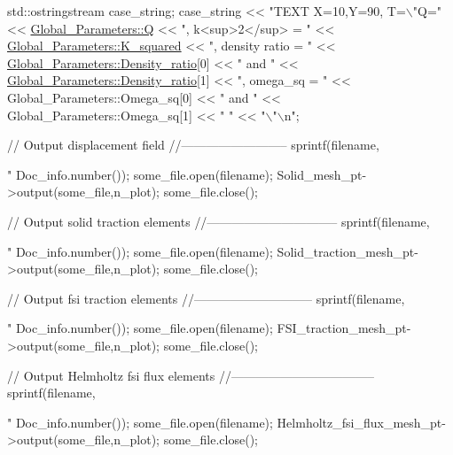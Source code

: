 \begin{DoxyCodeInclude}
{{ std::ostringstream case\_string;
 case\_string << \textcolor{stringliteral}{"TEXT X=10,Y=90, T=\(\backslash\)"Q="} 
             <<  \hyperlink{namespaceGlobal__Parameters_a7814fddf663e56168174a42d2cd6b4c1}{Global\_Parameters::Q} 
             << \textcolor{stringliteral}{",  k<sup>2</sup> = "}
             <<  \hyperlink{namespaceGlobal__Parameters_a91a3fa265abaf9e724c668ee800ffb29}{Global\_Parameters::K\_squared}
             << \textcolor{stringliteral}{",  density ratio = "}
             <<  \hyperlink{namespaceGlobal__Parameters_a517d4c31b8bce6563c2f605266dd9679}{Global\_Parameters::Density\_ratio}[0] << \textcolor{stringliteral}{" and "}
             <<  \hyperlink{namespaceGlobal__Parameters_a517d4c31b8bce6563c2f605266dd9679}{Global\_Parameters::Density\_ratio}[1] 
             << \textcolor{stringliteral}{",  omega\_sq = "}
             <<  Global\_Parameters::Omega\_sq[0] << \textcolor{stringliteral}{" and "} 
             <<  Global\_Parameters::Omega\_sq[1] << \textcolor{stringliteral}{" "} 
             << \textcolor{stringliteral}{"\(\backslash\)"\(\backslash\)n"};


 \textcolor{comment}{// Output displacement field}
 \textcolor{comment}{//--------------------------}
 sprintf(filename,\textcolor{stringliteral}{"%
         Doc\_info.number());
 some\_file.open(filename);
 Solid\_mesh\_pt->output(some\_file,n\_plot);
 some\_file.close();

 \textcolor{comment}{// Output solid traction elements}
 \textcolor{comment}{//--------------------------------}
 sprintf(filename,\textcolor{stringliteral}{"%
         Doc\_info.number());
 some\_file.open(filename);
 Solid\_traction\_mesh\_pt->output(some\_file,n\_plot);
 some\_file.close();

 \textcolor{comment}{// Output fsi traction elements}
 \textcolor{comment}{//----------------------------- }
 sprintf(filename,\textcolor{stringliteral}{"%
         Doc\_info.number());
 some\_file.open(filename);
 FSI\_traction\_mesh\_pt->output(some\_file,n\_plot);
 some\_file.close();


 \textcolor{comment}{// Output Helmholtz fsi flux elements}
 \textcolor{comment}{//----------------------------------- }
 sprintf(filename,\textcolor{stringliteral}{"%
         Doc\_info.number());
 some\_file.open(filename);
 Helmholtz\_fsi\_flux\_mesh\_pt->output(some\_file,n\_plot);
 some\_file.close();


}}}}}}
\end{DoxyCodeInclude}
